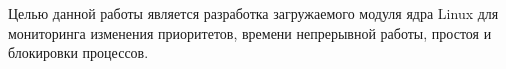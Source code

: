 
Целью данной работы является разработка загружаемого модуля ядра Linux для мониторинга изменения приоритетов, времени непрерывной работы, простоя и блокировки процессов.

